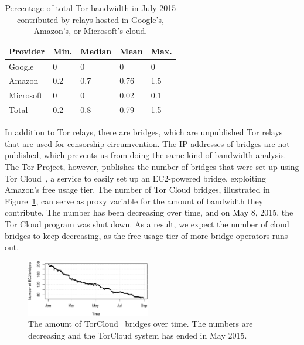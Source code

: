 \begin{table}[t]
	\centering
	\begin{tabular}{lllll}
	\textbf{Provider} & \textbf{Min.} & \textbf{Median} & \textbf{Mean} & \textbf{Max.} \\
	\hline
	Google & 0 & 0 & 0 & 0 \\
	Amazon & 0.2 & 0.7 & 0.76 & 1.5 \\
	Microsoft & 0 & 0 & 0.02 & 0.1 \\
	\hline
	Total & 0.2 & 0.8 & 0.79 & 1.5 \\
	\end{tabular}
	\caption{Percentage of total Tor bandwidth in July 2015 contributed by
	relays hosted in Google's, Amazon's, or Microsoft's cloud.}
	\label{tab:bwfraction}
\end{table}

In addition to Tor relays, there are bridges, which are unpublished Tor relays
that are used for censorship circumvention.  The IP addresses of bridges are
not published, which prevents us from doing the same kind of bandwidth
analysis.  The Tor Project, however, publishes the number of bridges that were
set up using Tor Cloud~\cite{torcloud}, a service to easily set up an
EC2-powered bridge, exploiting Amazon's free usage tier.  The number of Tor
Cloud bridges, illustrated in Figure~\ref{fig:cloudbridges}, can serve as proxy
variable for the amount of bandwidth they contribute.  The number has been
decreasing over time, and on May 8, 2015, the Tor Cloud program was shut down.
As a result, we expect the number of cloud bridges to keep decreasing, as the
free usage tier of more bridge operators runs out.

\begin{figure}[t]
	\centering
	\includegraphics[width=0.48\textwidth]{diagrams/torcloud.pdf}
	\caption{The amount of TorCloud~\cite{torcloud} bridges over time.  The
	numbers are decreasing and the TorCloud system has ended in May 2015.}
	\label{fig:cloudbridges}
\end{figure}

